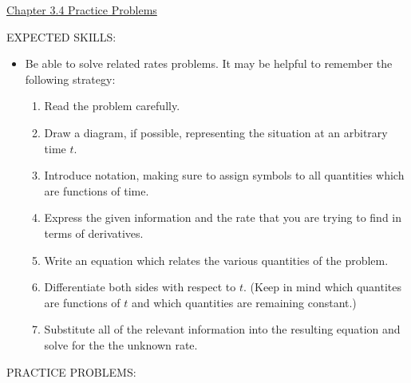 \documentclass[12pt]{article}
\begin{document}
\begin{center}
\underline{\LARGE{Chapter 3.4 Practice Problems}}
\end{center}

\noindent EXPECTED SKILLS:

\begin{itemize}

\item Be able to solve related rates problems. It may be helpful to remember the following strategy:

\begin{enumerate}

\item Read the problem carefully.

\item Draw a diagram, if possible, representing the situation at an arbitrary time $t$.

\item Introduce notation, making sure to assign symbols to all quantities which are functions of time.

\item Express the given information and the rate that you are trying to find in terms of derivatives.

\item Write an equation which relates the various quantities of the problem. 

\item Differentiate both sides with respect to $t$.  (Keep in mind which quantites are functions of $t$ and which quantities are remaining constant.)

\item Substitute all of the relevant information into the resulting equation and solve for the the unknown rate.

\end{enumerate}

\end{itemize}

\noindent PRACTICE PROBLEMS:

\medskip
\end{document}
